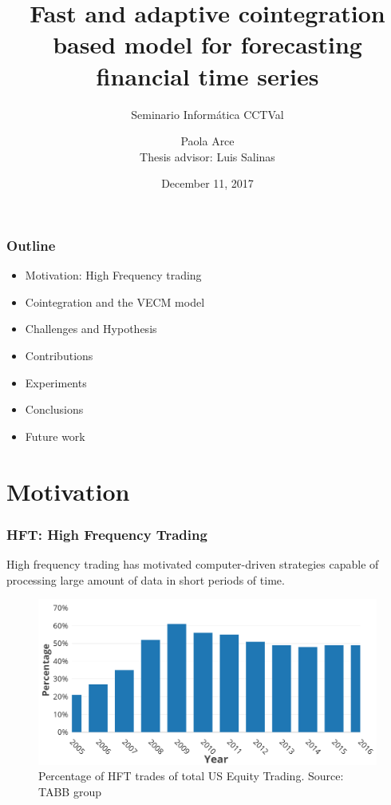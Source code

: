 \documentclass{beamer}
\author[Paola Arce]{Paola Arce \\ Thesis advisor: Luis Salinas}
\date{December 11, 2017}
\title[Thesis defense]{Fast and adaptive cointegration based model for forecasting financial time series}
\subtitle{Seminario Inform\'atica CCTVal}
\begin{document}
\begin{frame}[plain]
\titlepage
{}

\end{frame}

\begin{frame}
\frametitle{Outline}
\begin{itemize}
\item Motivation: High Frequency trading
\item Cointegration and the VECM model
\item Challenges and Hypothesis
\item Contributions
\item Experiments
\item Conclusions
\item Future work
\end{itemize}
\end{frame}

\section{Motivation}

\begin{frame}
\frametitle{HFT: High Frequency Trading}
High frequency trading has motivated computer-driven strategies capable of processing large amount of data in short periods of time.
\begin{figure}
\includegraphics[width=0.7\paperwidth]{img/HFTmarket}
\caption{Percentage of HFT trades of total US Equity Trading. Source: TABB group}
\end{figure}
\end{frame}
\end{document}
